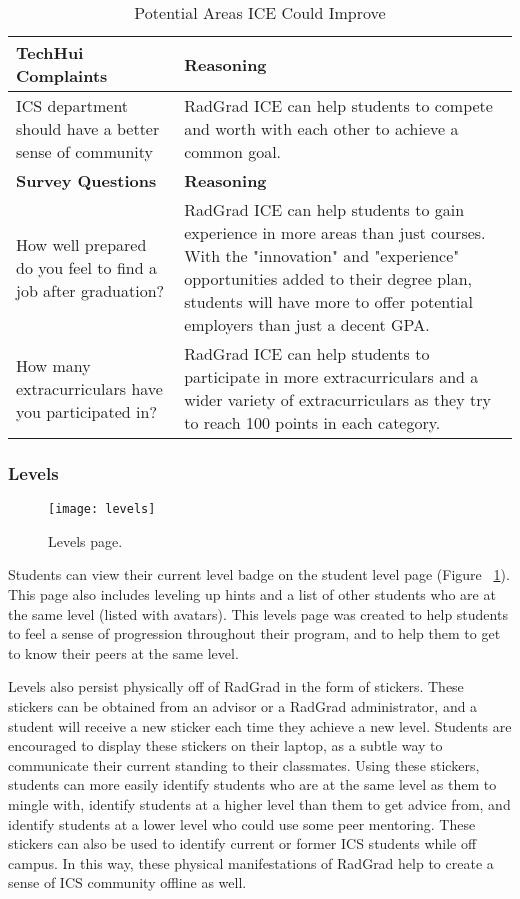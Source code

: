 \begin{table}[htbp!]
\centering
 \caption{Potential Areas ICE Could Improve}
\begin{tabular}{  |p{4cm}|p{12cm}| } 
\hline
 \textbf{TechHui Complaints} & \textbf{Reasoning} \\ 
  \hline
  ICS department should have a better sense of community & RadGrad ICE can help students to compete and worth with each other to achieve a common goal.\\
  \hline
 \textbf{Survey Questions} & \textbf{Reasoning} \\ 
  \hline
  How well prepared do you feel to find a job after graduation? & RadGrad ICE can help students to gain experience in more areas than just courses. With the "innovation" and "experience" opportunities added to their degree plan, students will have more to offer potential employers than just a decent GPA.\\
  \hline
    How many extracurriculars have you participated in? & RadGrad ICE can help students to participate in more extracurriculars and a wider variety of extracurriculars as they try to reach 100 points in each category. \\
    \hline\end{tabular}
\end{table}

\subsubsection{Levels}

\begin{figure}[htbp!]
\centering
\texttt{[image: levels]}
\caption{Levels page.}
\label{levels}
\end{figure}

Students can view their current level badge on the student level page (Figure ~\ref{levels}). This page also includes leveling up hints and a list of other students who are at the same level (listed with avatars). This levels page was created to help students to feel a sense of progression throughout their program, and to help them to get to know their peers at the same level.

Levels also persist physically off of RadGrad in the form of stickers. These stickers can be obtained from an advisor or a RadGrad administrator, and a student will receive a new sticker each time they achieve a new level. Students are encouraged to display these stickers on their laptop, as a subtle way to communicate their current standing to their classmates. Using these stickers, students can more easily identify students who are at the same level as them to mingle with, identify students at a higher level than them to get advice from, and identify students at a lower level who could use some peer mentoring. These stickers can also be used to identify current or former ICS students while off campus. In this way, these physical manifestations of RadGrad help to create a sense of ICS community offline as well. 

